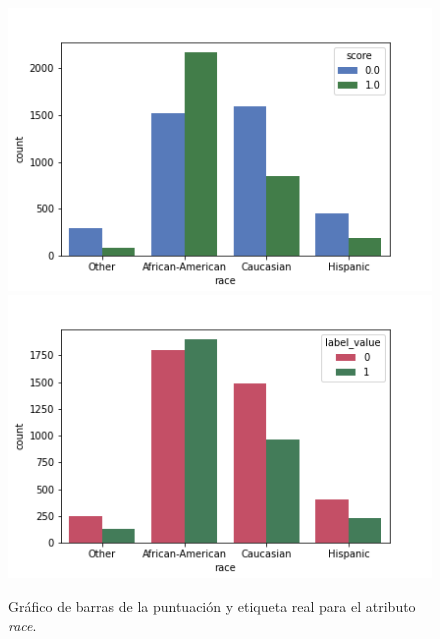 \begin{figure}[h]
      \includegraphics[width=\linewidth]{images/score_race.png}
    \endminipage\hfill
      \includegraphics[width=\linewidth]{images/label_race.png}
    \endminipage
     \caption{Gráfico de barras de la puntuación y etiqueta real para el atributo \textit{race}.}
     \label{fig:barrasrace}
\end{figure}

